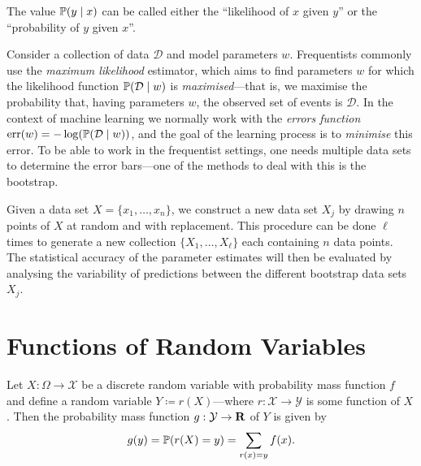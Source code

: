 \begin{remark}
\label{rem:likelihood}
The value \(\operatorname{\mathbb{P}}(y \mid x)\) can be called either the ``likelihood of \(x\) given
\(y\)'' or the ``probability of \(y\) given \(x\)''.
\end{remark}

Consider a collection of data \(\mathcal{D}\) and model parameters
\(w\). Frequentists commonly use the \emph{maximum likelihood} estimator, which
aims to find parameters \(w\) for which the likelihood function
\(\operatorname{\mathbb{P}}(\mathcal{D} \mid w)\) is \emph{maximised}---that is, we maximise the
probability that, having parameters \(w\), the observed set of events is
\(\mathcal{D}\). In the context of machine learning we normally work
with the \emph{errors function}
\(\operatorname{err}(w) = -\log(\operatorname{\mathbb{P}}(\mathcal{D} \mid w))\), and the goal of
the learning process is to \emph{minimise} this error. To be able to work in the
frequentist settings, one needs multiple data sets to determine the error
bars---one of the methods to deal with this is the bootstrap.

\begin{definition}
\label{def:bootstrap-data-sets}
Given a data set \(X = \{x_1, \dots, x_n\}\), we construct a new data set
\(X_j\) by drawing \(n\) points of \(X\) at random and with replacement. This
procedure can be done \(\ell\) times to generate a new collection \(\{X_1,
\dots, X_{\ell}\}\) each containing \(n\) data points. The statistical accuracy
of the parameter estimates will then be evaluated by analysing the variability
of predictions between the different bootstrap data sets \(X_j\).
\end{definition}

\section{Functions of Random Variables}

\begin{proposition}
\label{prop:fn-of-rand-var-discrete-case}
Let \(X: \Omega \to \mathcal{X}\) be a discrete random variable with probability
mass function \(f\) and define a random variable \(Y \coloneq r(X)\)---where
\(r: \mathcal{X} \to \mathcal{Y}\) is some function of \(X\). Then the
probability mass function \(g: \mathcal{Y} \to \mathbf{R}\) of \(Y\) is given by
\[
g(y) = \operatorname{\mathbb{P}}(r(X) = y) = \sum_{r(x) = y} f(x).
\]
\end{proposition}

